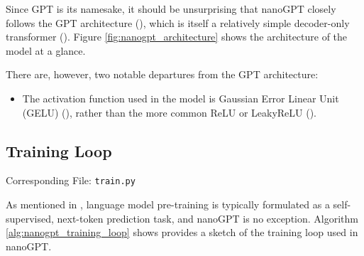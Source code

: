 \documentclass{article} %
\theoremstyle{definition}
\begin{document}
Since GPT is its namesake, it should be unsurprising that nanoGPT closely follows 
the GPT architecture (\cite{radford-et-al-2019}), which is itself 
a relatively simple decoder-only transformer (\cite{vaswani-et-al-2017}).
Figure \ref{fig:nanogpt_architecture} shows the architecture of the model at a glance.

There are, however, two notable departures from the GPT architecture:
\begin{itemize}
    \item The activation function used in the model is Gaussian Error Linear Unit (GELU) (\cite{gelu}),
rather than the more common ReLU or LeakyReLU (\cite{xu-et-al-2015, relu}).
\end{itemize} 


\subsection{Training Loop}
Corresponding File: \texttt{train.py}

As mentioned in \cite{beh-2025}, language model pre-training
is typically formulated as a self-supervised, next-token prediction task,
and nanoGPT is no exception. Algorithm \ref{alg:nanogpt_training_loop} shows 
provides a sketch of the training loop used in nanoGPT.

\end{document}
